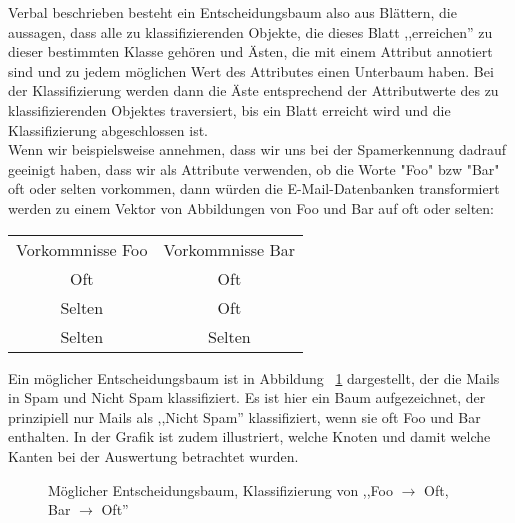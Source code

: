 \documentclass{article}
\begin{document}
Verbal beschrieben besteht ein Entscheidungsbaum also aus Bl\"attern,
die aussagen, dass alle zu klassifizierenden Objekte, die dieses Blatt 
,,erreichen'' zu dieser bestimmten Klasse geh\"oren und \"Asten, 
die mit einem Attribut annotiert sind und zu jedem m\"oglichen 
Wert des Attributes einen Unterbaum haben. Bei der Klassifizierung 
werden dann die \"Aste entsprechend der Attributwerte des zu 
klassifizierenden Objektes traversiert, bis ein Blatt erreicht 
wird und die Klassifizierung abgeschlossen ist.\\
Wenn wir beispielsweise annehmen, dass wir uns bei der Spamerkennung dadrauf
geeinigt haben, dass wir als Attribute verwenden, ob die Worte "Foo" bzw
"Bar" oft oder selten vorkommen, dann w\"urden die
E-Mail-Datenbanken transformiert werden zu einem Vektor von Abbildungen
von Foo und Bar auf oft oder selten:\\
\begin{tabular}{c c}
Vorkommnisse Foo & Vorkommnisse Bar \\
Oft & Oft \\
Selten & Oft \\
Selten & Selten \\
\end{tabular}
Ein m\"oglicher Entscheidungsbaum ist in Abbildung ~\ref{fig:decision_tree_example} 
dargestellt, der die Mails in Spam und Nicht Spam klassifiziert. Es ist hier ein
Baum aufgezeichnet, der prinzipiell nur Mails als ,,Nicht Spam'' klassifiziert,
wenn sie oft Foo und Bar enthalten. In der Grafik ist zudem illustriert, welche 
Knoten und damit welche Kanten bei der Auswertung betrachtet wurden.
\begin{figure}
\caption{M\"oglicher Entscheidungsbaum, Klassifizierung von 
,,Foo \(\rightarrow\) Oft, Bar \(\rightarrow\) Oft''}
\label{fig:decision_tree_example}
\end{figure}\\
\end{document}
